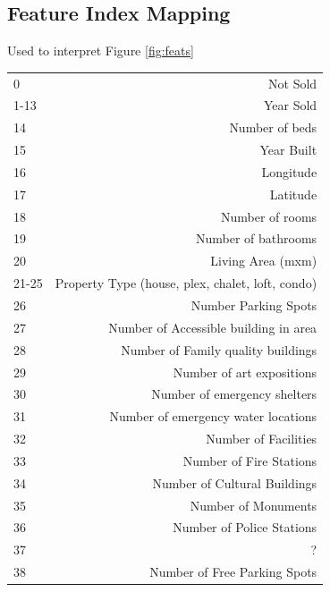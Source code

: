 \documentclass{acm_proc_article-sp}
\begin{document}
\subsection{Feature Index Mapping}
Used to interpret Figure \ref{fig:feats} \\

\begin{tabular}{ l | r }
  0 & Not Sold \\
  1-13 & Year Sold \\
  14 & Number of beds \\
  15 & Year Built\\
  16 & Longitude\\
  17 & Latitude\\
  18 & Number of rooms\\
  19 & Number of bathrooms\\
  20 & Living Area (mxm)\\
  21-25 & Property Type (house, plex, chalet, loft, condo)\\
  26 & Number Parking Spots\\
  27 & Number of Accessible building in area\\
  28 & Number of Family quality buildings\\
  29 & Number of art expositions\\
  30 & Number of emergency shelters\\
  31 & Number of emergency water locations\\
  32 & Number of Facilities\\
  33 & Number of Fire Stations\\
  34 & Number of Cultural Buildings\\
  35 & Number of Monuments\\
  36 & Number of Police Stations\\
  37 & ?\\
  38 & Number of Free Parking Spots\\
\end{tabular}
\end{document}
